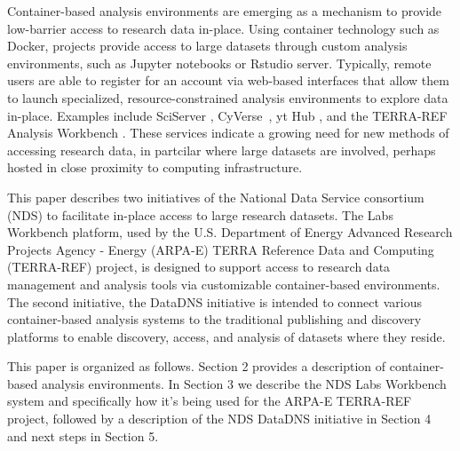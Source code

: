 \documentclass{sig-alternate}
\begin{document}
Container-based analysis environments are emerging as a mechanism to provide low-barrier access to research data in-place.  Using container technology such as Docker, projects provide access to large datasets through custom analysis environments, such as Jupyter notebooks or Rstudio server.  Typically, remote users are able to register for an account via web-based interfaces that allow them to launch specialized, resource-constrained analysis environments to explore data in-place. Examples include SciServer \cite{Medvedev:2016:SCB:2949689.2949700}, CyVerse~\cite{Merchant16}, yt Hub \cite{zuhone2016galaxy}, and the TERRA-REF Analysis Workbench \cite{willis_craig_2017_580057}.  These services indicate a growing need for new methods of accessing research data, in partcilar where large datasets are involved, perhaps hosted in close proximity to computing infrastructure.

This paper describes two initiatives of the National Data Service consortium (NDS) to facilitate in-place access to large research datasets. The Labs Workbench platform, used by the U.S. Department of Energy Advanced Research Projects Agency - Energy (ARPA-E) TERRA Reference Data and Computing (TERRA-REF) project, is designed to support access to research data management and analysis tools via customizable container-based environments.  The second initiative, the DataDNS initiative is intended to connect various container-based analysis systems to the traditional publishing and discovery platforms to enable discovery, access, and analysis of datasets where they reside.



This paper is organized as follows.  Section 2 provides a description of container-based analysis environments.  In Section 3 we describe the NDS Labs Workbench system and specifically how it's being used for the ARPA-E TERRA-REF project, followed by a description of the NDS DataDNS initiative in Section 4 and next steps in Section 5.

\end{document}
